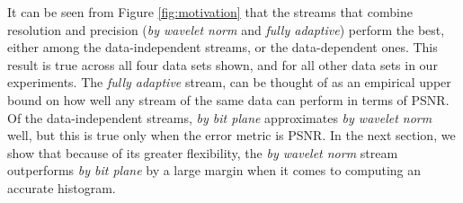  It can be seen from Figure \ref{fig:motivation} that the streams that combine
  resolution and precision (\emph{by wavelet norm} and \emph{fully adaptive}) perform the best,
  either among the data-independent streams, or the data-dependent ones. This result is true across
  all four data sets shown, and for all other data sets in our experiments. The \emph{fully
  adaptive} stream, can be thought of as an empirical upper bound on how well any stream of the same
  data can perform in terms of PSNR. Of the data-independent streams, \emph{by bit plane}
  approximates \emph{by wavelet norm}  well, but this is true only when the error metric is PSNR. In
  the next section, we show that because of its greater flexibility, the \emph{by wavelet norm}
  stream outperforms \emph{by bit plane} by a large margin when it comes to computing an accurate
  histogram.




